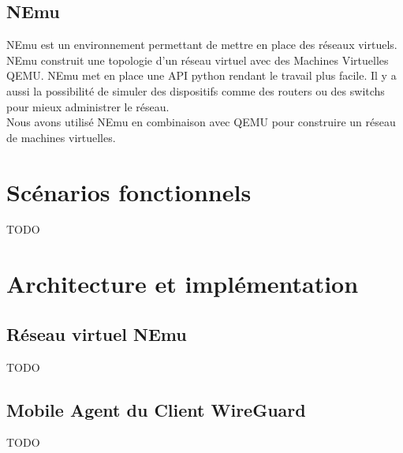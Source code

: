 \documentclass[12pt, openany]{report}
\begin{document}
\subsection{NEmu}
\noindent 
\begin{flushleft}
NEmu est un environnement permettant de mettre en place des réseaux virtuels. NEmu construit une topologie d'un réseau virtuel avec des Machines Virtuelles QEMU. NEmu met en place une API python rendant le travail plus facile. Il y a aussi la possibilité de simuler des dispositifs comme des routers ou des switchs pour mieux administrer le réseau. \\
Nous avons utilisé NEmu en combinaison avec QEMU pour construire un réseau de machines virtuelles.
\end{flushleft}

\section{Scénarios fonctionnels}
\noindent 
\begin{flushleft}
TODO
\end{flushleft}

\section{Architecture et implémentation}

\subsection{Réseau virtuel NEmu}
\noindent 
\begin{flushleft}
TODO
\end{flushleft}

\subsection{Mobile Agent du Client WireGuard}
\noindent 
\begin{flushleft}
TODO
\end{flushleft}
\end{document}
